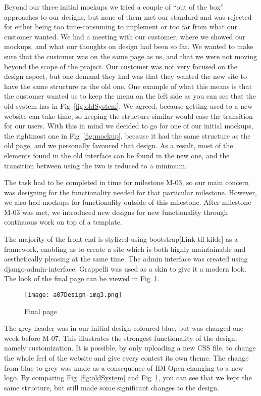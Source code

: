 Beyond our three initial mockups we tried a couple of ``out
of the box'' approaches to our designs, but none of them
met our standard and was rejected for either being too time-consuming
to implement or too far from what our customer wanted. We had a meeting
with our customer, where we showed our mockups, and what our thoughts
on design had been so far. We wanted to make sure that the customer
was on the same page as us, and that we were not moving beyond the
scope of the project. Our customer was not very focused
on the design aspect, but one demand they had was that they wanted the
new site to have the same structure as the old one. One example of what
this means is that the customer wanted us to keep the menu on the
left side as you can see that the old system has in Fig~\ref{fig:oldSystem}. We agreed,
because getting used to a new website can take time, so keeping the
structure similar would ease the transition for our users. With this in
mind we decided to go for one of our initial mockups, the rightmost one
in Fig~\ref{fig:mockup}, because it had the same structure as the old page, and we
personally favoured that design. As a result, most of the elements
found in the old interface can be found in the new one, and the
transition between using the two is reduced to a minimum.

The task had to be completed in time for milestone M-03, so our main
concern was designing for the functionality needed for that particular
milestone. However, we also had mockups for functionality outside of
this milestone. After milestone M-03 was met, we introduced new designs
for new functionality through continuous work on top of a template.

The majority of the front end is stylized using bootstrap[Link til
kilde] as a framework, enabling us to create a site which is both
highly maintainable and aesthetically pleasing at the same time. The
admin interface was created using django-admin-interface. Grappelli
was used as a skin to give it a modern look. The look of the final page
can be viewed in Fig~\ref{fig:finalUI}.


 \begin{figure}[h!]
	\texttt{[image: a07Design-img3.png]} 
	\caption{Final page}
	\label{fig:finalUI}
\end{figure}

The grey header was in our
initial design coloured blue, but was changed one week before M-07.
This illustrates the strongest
functionality of the design, namely customization. It is possible, by
only uploading a new CSS file, to change the whole feel of the website
and give every contest its own theme. The change from blue to grey was made
as a consequence of IDI Open changing to a new logo. By comparing
Fig~\ref{fig:oldSystem} and Fig~\ref{fig:finalUI}, you can see that we kept the same structure, but
still made some significant changes to the design.


